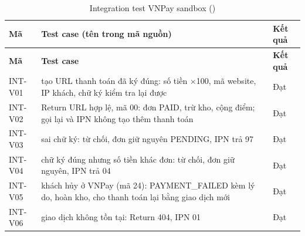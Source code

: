{\small
\begin{longtable}{@{}L{1.9cm}L{10.6cm}L{1.3cm}@{}}
\caption{Integration test VNPay sandbox ()}\label{tab:intv}\\
\toprule
\textbf{Mã} & \textbf{Test case (tên trong mã nguồn)} & \textbf{Kết quả} \\ \midrule \endfirsthead
\toprule \textbf{Mã} & \textbf{Test case} & \textbf{Kết quả} \\ \midrule \endhead
\bottomrule \endfoot
INT-V01 & tạo URL thanh toán đã ký đúng: số tiền $\times$100, mã website, IP khách, chữ ký kiểm tra lại được & Đạt \\
INT-V02 & Return URL hợp lệ, mã 00: đơn PAID, trừ kho, cộng điểm; gọi lại và IPN không tạo thêm thanh toán & Đạt \\
INT-V03 & sai chữ ký: từ chối, đơn giữ nguyên PENDING, IPN trả 97 & Đạt \\
INT-V04 & chữ ký đúng nhưng số tiền khác đơn: từ chối, đơn giữ nguyên, IPN trả 04 & Đạt \\
INT-V05 & khách hủy ở VNPay (mã 24): PAYMENT\_FAILED kèm lý do, hoàn kho, cho thanh toán lại bằng giao dịch mới & Đạt \\
INT-V06 & giao dịch không tồn tại: Return 404, IPN 01 & Đạt \\
\end{longtable}
}
